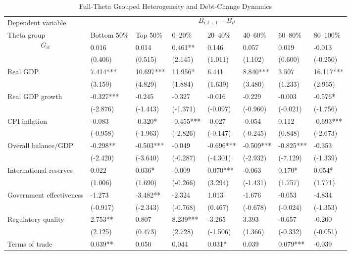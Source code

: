 \begin{table}[H]\centering
\begin{threeparttable}
\caption{Full-Theta Grouped Heterogeneity and Debt-Change Dynamics}
\label{tab:theta_group_heterogeneity_debt}
\scriptsize
\begin{tabularx}{\textwidth}{lYYYYYYY}
\toprule
Dependent variable &  \\
\cmidrule(lr){2-8}
Theta group & Bottom 50\% & Top 50\% & 0--20\% & 20--40\% & 40--60\% & 60--80\% & 80--100\% \\
\midrule
$$G_{it}$$ & 0.016 & 0.014 & 0.461** & 0.146 & 0.057 & 0.019 & -0.013 \\
  & (0.406) & (0.515) & (2.145) & (1.011) & (1.102) & (0.600) & (-0.250) \\
Real GDP & 7.414*** & 10.697*** & 11.956* & 6.441 & 8.840*** & 3.507 & 16.117*** \\
  & (3.159) & (4.829) & (1.884) & (1.639) & (3.480) & (1.233) & (2.965) \\
Real GDP growth & -0.327*** & -0.245 & -0.327 & -0.016 & -0.229 & -0.003 & -0.576* \\
  & (-2.876) & (-1.443) & (-1.371) & (-0.097) & (-0.960) & (-0.021) & (-1.756) \\
CPI inflation & -0.083 & -0.320* & -0.455*** & -0.027 & -0.054 & 0.112 & -0.693*** \\
  & (-0.958) & (-1.963) & (-2.826) & (-0.147) & (-0.245) & (0.848) & (-2.673) \\
Overall balance/GDP & -0.298** & -0.503*** & -0.049 & -0.696*** & -0.509*** & -0.825*** & -0.353 \\
  & (-2.420) & (-3.640) & (-0.287) & (-4.301) & (-2.932) & (-7.129) & (-1.339) \\
International reserves & 0.022 & 0.036* & -0.009 & 0.070*** & -0.063 & 0.170* & 0.054* \\
  & (1.006) & (1.690) & (-0.266) & (3.294) & (-1.431) & (1.757) & (1.771) \\
Government effectiveness & -1.273 & -3.482** & -2.324 & 1.013 & -1.676 & -0.053 & -4.834 \\
  & (-0.917) & (-2.343) & (-0.768) & (0.467) & (-0.678) & (-0.024) & (-1.353) \\
Regulatory quality & 2.753** & 0.807 & 8.239*** & -3.265 & 3.393 & -0.657 & -0.200 \\
  & (2.125) & (0.473) & (2.728) & (-1.506) & (1.366) & (-0.332) & (-0.051) \\
Terms of trade & 0.039** & 0.050 & 0.044 & 0.031* & 0.039 & 0.079*** & -0.039 \\

\end{tabularx}
\end{threeparttable}
\end{table}
